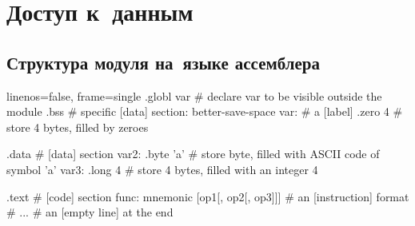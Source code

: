 
\chapter{Доступ к~данным}

\section{Структура модуля на~языке ассемблера}
\begin{gascode*}{linenos=false, frame=single}
  .globl   var       # declare var to be visible outside the module
  .bss               # specific [data] section: better-save-space
var:                 # a [label]
  .zero    4         # store 4 bytes, filled by zeroes

  .data              # [data] section
var2:
  .byte    'a'       # store byte, filled with ASCII code of symbol 'a'
var3:
  .long    4         # store 4 bytes, filled with an integer 4

  .text              # [code] section
func:
  mnemonic [op1[, op2[, op3]]]  # an [instruction] format
  # ...
                     # an [empty line] at the end
\end{gascode*}



